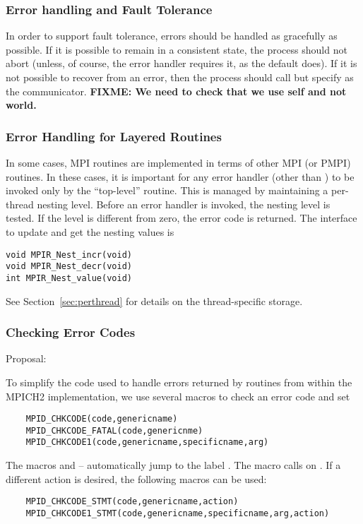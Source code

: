 \documentclass{article}
\def\fixme#1{\marginpar{FIXME:}\textbf{FIXME: #1}}
\begin{document}
\subsubsection{Error handling and Fault Tolerance}
\label{sec:errs-and-faults}
In order to support fault tolerance, errors should be handled as
gracefully as possible.  If it is possible to remain in a consistent
state, the process should not abort (unless, of course, the error
handler requires it, as the default  does).  
If it is not possible to recover from an error, then the process
should call  but specify  as the
communicator.  \fixme{We need to check that we use self and not world.}

\subsubsection{Error Handling for Layered Routines}
\label{sec:err-handling-nested}
In some cases, MPI routines are implemented in terms of other MPI (or
PMPI) routines.  In these cases, it is important for any error handler
(other than ) to be invoked only by the
``top-level'' routine.  
This is managed by maintaining a per-thread nesting level.  Before an error
handler is invoked, the nesting level is tested.  If the level is different
from zero, the error code is returned.  The interface to update and
get the nesting values is
\begin{verbatim}
void MPIR_Nest_incr(void)
void MPIR_Nest_decr(void)
int MPIR_Nest_value(void)
\end{verbatim}
See Section~\ref{sec:perthread} for details on the thread-specific storage.

\subsubsection{Checking Error Codes}
\label{sec:err-handling-chkmacros}
Proposal:

To simplify the code used to handle errors returned by routines from within
the MPICH2 implementation, we use several macros to check an error code and
set 
\begin{verbatim}
    MPID_CHKCODE(code,genericname)
    MPID_CHKCODE_FATAL(code,genericnme)
    MPID_CHKCODE1(code,genericname,specificname,arg)
\end{verbatim}
The macros  and --
automatically jump to the label .  
The macro  calls  on
. 
If a different action is desired, the following macros can be used:
\begin{verbatim}
    MPID_CHKCODE_STMT(code,genericname,action)
    MPID_CHKCODE1_STMT(code,genericname,specificname,arg,action)
\end{verbatim}
\end{document}
